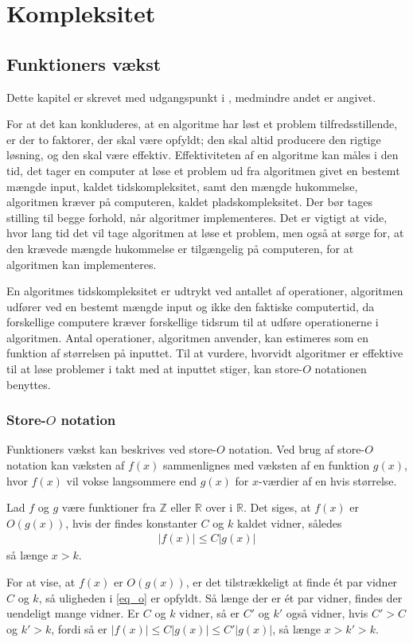 \chapter{Kompleksitet}
\section{Funktioners vækst}
Dette kapitel er skrevet med udgangspunkt i \citep{dmat} , medmindre andet er angivet. 

For at det kan konkluderes, at en algoritme har løst et problem tilfredsstillende, er der to faktorer, der skal være opfyldt; den skal altid producere den rigtige løsning, og den skal være effektiv. 
Effektiviteten af en algoritme kan måles i den tid, det tager en computer at løse et problem ud fra algoritmen givet en bestemt mængde input, kaldet tidskompleksitet, samt den mængde hukommelse, algoritmen kræver på computeren, kaldet pladskompleksitet. 
Der bør tages stilling til begge forhold, når algoritmer implementeres.
Det er vigtigt at vide, hvor lang tid det vil tage algoritmen at løse et problem, men også at sørge for, at den krævede mængde hukommelse er tilgængelig på computeren, for at algoritmen kan implementeres.

En algoritmes tidskompleksitet er udtrykt ved antallet af operationer, algoritmen udfører ved en bestemt mængde input og ikke den faktiske computertid, da forskellige computere kræver forskellige tidsrum til at udføre operationerne i algoritmen. 
Antal operationer, algoritmen anvender, kan estimeres som en funktion af størrelsen på inputtet. 
Til at vurdere, hvorvidt algoritmer er effektive til at løse problemer i takt med at inputtet stiger, kan store-$O$ notationen benyttes.

\subsection{Store-$O$ notation}
Funktioners vækst kan beskrives ved store-$O$ notation.
Ved brug af store-$O$ notation kan væksten af $f(x)$ sammenlignes med væksten af en funktion $g(x)$, hvor $f(x)$ vil vokse langsommere end $g(x)$ for $x$-værdier af en hvis størrelse. \\
\begin{defn}\label{eq_o}
	Lad $f$ og $g$ være funktioner fra $\mathbb{Z}$ eller $\mathbb{R}$ over i $\mathbb{R}$. 
	Det siges, at $f(x)$ er $O(g(x))$, hvis der findes konstanter $C$ og $k$ kaldet vidner, således 
\begin{align}
|f(x)| \leq C |g(x)|
\end{align}
så længe $x>k$.
\end{defn}
\noindent For at vise, at $f(x)$ er $O(g(x))$, er det tilstrækkeligt at finde ét par vidner $C$ og $k$, så uligheden i \eqref{eq_o} er opfyldt. Så længe der er ét par vidner, findes der uendeligt mange vidner. Er $C$ og $k$ vidner, så er $C'$ og $k'$ også vidner, hvis $C'>C$ og $k'>k$, fordi så er $|f(x)| \leq C |g(x)| \leq C' |g(x)| $, så længe $x>k'>k$.  

